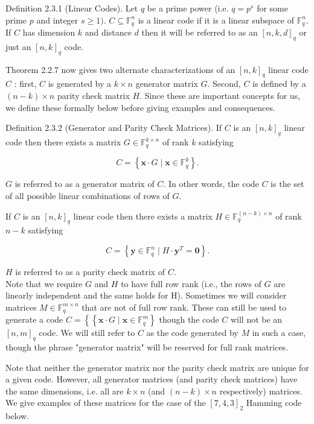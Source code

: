 \documentclass[10pt]{article}
\begin{document}
Definition 2.3.1 (Linear Codes). Let $q$ be a prime power (i.e. $q=p^{s}$ for some prime $p$ and integer $s \geq 1)$. $C \subseteq \mathbb{F}_{q}^{n}$ is a linear code if it is a linear subspace of $\mathbb{F}_{q}^{n}$. If $C$ has dimension $k$ and distance $d$ then it will be referred to as an $[n, k, d]_{q}$ or just an $[n, k]_{q}$ code.

Theorem 2.2.7 now gives two alternate characterizations of an $[n, k]_{q}$ linear code $C$ : first, $C$ is generated by a $k \times n$ generator matrix $G$. Second, $C$ is defined by a $(n-k) \times n$ parity check matrix $H$. Since these are important concepts for us, we define these formally below before giving examples and consequences.

Definition 2.3.2 (Generator and Parity Check Matrices). If $C$ is an $[n, k]_{q}$ linear code then there exists a matrix $G \in \mathbb{F}_{q}^{k \times n}$ of rank $k$ satisfying

$$
C=\left\{\mathbf{x} \cdot G \mid \mathbf{x} \in \mathbb{F}_{q}^{k}\right\} .
$$

$G$ is referred to as a generator matrix of $C$. In other words, the code $C$ is the set of all possible linear combinations of rows of $G$.

If $C$ is an $[n, k]_{q}$ linear code then there exists a matrix $H \in \mathbb{F}_{q}^{(n-k) \times n}$ of rank $n-k$ satisfying

$$
C=\left\{\mathbf{y} \in \mathbb{F}_{q}^{n} \mid H \cdot \mathbf{y}^{T}=\mathbf{0}\right\} .
$$

$H$ is referred to as a parity check matrix of $C$.\\
Note that we require $G$ and $H$ to have full row rank (i.e., the rows of $G$ are linearly independent and the same holds for H). Sometimes we will consider matrices $M \in \mathbb{F}_{q}^{m \times n}$ that are not of full row rank. These can still be used to generate a code $C=\left\{\left\{\mathbf{x} \cdot G \mid \mathbf{x} \in \mathbb{F}_{q}^{m}\right\}\right.$ though the code $C$ will not be an $[n, m]_{q}$ code. We will still refer to $C$ as the code generated by $M$ in such a case, though the phrase "generator matrix" will be reserved for full rank matrices.

Note that neither the generator matrix nor the parity check matrix are unique for a given code. However, all generator matrices (and parity check matrices) have the same dimensions, i.e. all are $k \times n$ (and $(n-k) \times n$ respectively) matrices. We give examples of these matrices for the case of the $[7,4,3]_{2}$ Hamming code below.
\end{document}
